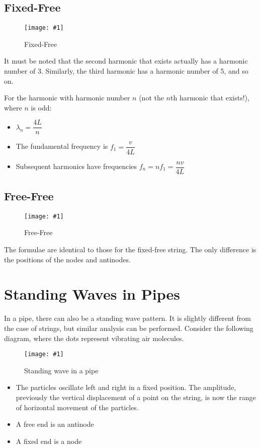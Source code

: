 \documentclass[a4paper,12pt]{article}
\let\oldsection\section
\renewcommand\section{\clearpage\oldsection}
\newcommand{\img}[4]{\begin{center}
  \begin{figure}[H]
    \centering
    \texttt{[image: \#1]}
    \caption{#3}
    \label{fig:#4}
  \end{figure}
\end{center}}
\begin{document}
\pagebreak

\subsection{Fixed-Free}

\img{string2.png}{0.65}{Fixed-Free}{string2}

It must be noted that the second harmonic that exists actually has a harmonic number of 3. Similarly, the third harmonic has a harmonic number of 5, and so on.

For the harmonic with harmonic number $n$ (not the $n$th harmonic that exists!), where $n$ is odd:

\begin{itemize}
  \item $\lambda_n = \dfrac{4L}{n}$
  \item The fundamental frequency is $f_1 = \dfrac{v}{4L}$
  \item Subsequent harmonics have frequencies $f_n = nf_1 = \dfrac{nv}{4L}$
\end{itemize}

\pagebreak

\subsection{Free-Free}

\img{string3.png}{0.45}{Free-Free}{string3}

The formulae are identical to those for the fixed-free string. The only difference is the positions of the nodes and antinodes.

\section{Standing Waves in Pipes}

In a pipe, there can also be a standing wave pattern. It is slightly different from the case of strings, but similar analysis can be performed.
Consider the following diagram, where the dots represent vibrating air molecules.
\img{pipe.png}{0.8}{Standing wave in a pipe}{pipe}
\begin{itemize}
  \item The particles oscillate left and right in a fixed position. The amplitude, previously the vertical displacement of a point on the string, is now the range of horizontal movement of the particles.
  \item A free end is an antinode
  \item A fixed end is a node
\end{itemize}
\end{document}
